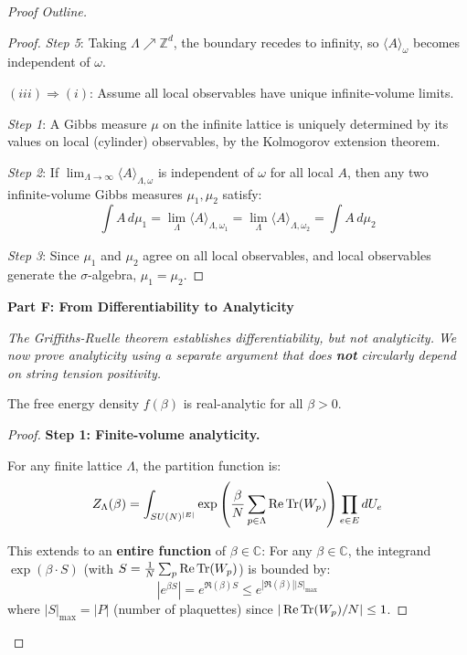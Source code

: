 \begin{proof}[Proof Outline]
\begin{proof}
\textit{Step 5}: Taking $\Lambda \nearrow \mathbb{Z}^d$, the boundary 
recedes to infinity, so $\langle A \rangle_\omega$ becomes independent of $\omega$.

\textbf{$(iii) \Rightarrow (i)$}: Assume all local observables have unique 
infinite-volume limits.

\textit{Step 1}: A Gibbs measure $\mu$ on the infinite lattice is uniquely 
determined by its values on local (cylinder) observables, by the 
Kolmogorov extension theorem.

\textit{Step 2}: If $\lim_{\Lambda \to \infty} \langle A \rangle_{\Lambda,\omega}$ 
is independent of $\omega$ for all local $A$, then any two infinite-volume 
Gibbs measures $\mu_1, \mu_2$ satisfy:
\[
\int A \, d\mu_1 = \lim_{\Lambda} \langle A \rangle_{\Lambda,\omega_1} = 
\lim_{\Lambda} \langle A \rangle_{\Lambda,\omega_2} = \int A \, d\mu_2
\]

\textit{Step 3}: Since $\mu_1$ and $\mu_2$ agree on all local observables, 
and local observables generate the $\sigma$-algebra, $\mu_1 = \mu_2$.
\end{proof}

\textbf{Part F: From Differentiability to Analyticity}

\textit{The Griffiths-Ruelle theorem establishes differentiability, but not 
analyticity. We now prove analyticity using a separate argument that does 
\textbf{not} circularly depend on string tension positivity.}

\begin{lemma}
\label{lem:analyticity-direct}
The free energy density $f(\beta)$ is real-analytic for all $\beta > 0$.
\end{lemma}

\begin{proof}
\textbf{Step 1: Finite-volume analyticity.}

For any finite lattice $\Lambda$, the partition function is:
\[
Z_\Lambda(\beta) = \int_{SU(N)^{|E|}} \exp\left(\frac{\beta}{N} \sum_{p \in \Lambda} \operatorname{Re}\operatorname{Tr}(W_p)\right) \prod_{e \in E} dU_e
\]

This extends to an \textbf{entire function} of $\beta \in \mathbb{C}$: For any $\beta \in \mathbb{C}$, 
the integrand $\exp(\beta \cdot S)$ (with $S = \frac{1}{N}\sum_p \operatorname{Re}\operatorname{Tr}(W_p)$) is bounded by:
\[
\left|e^{\beta S}\right| = e^{\Re(\beta) S} \leq e^{|\Re(\beta)| |S|_{\max}}
\]
where $|S|_{\max} = |P|$ (number of plaquettes) since $|\operatorname{Re}\operatorname{Tr}(W_p)/N| \leq 1$.


\end{proof}
\end{proof}
